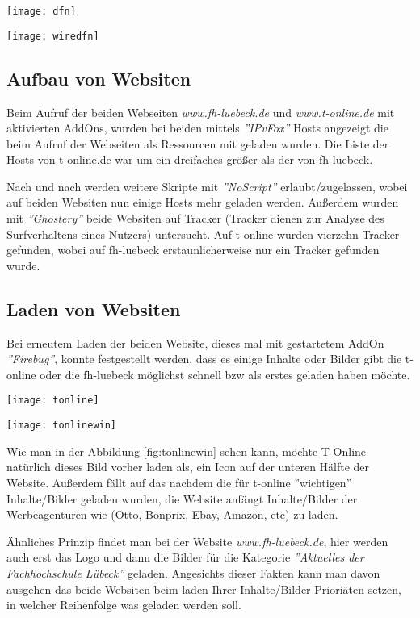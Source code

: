 \documentclass{scrartcl}
\begin{document}
    \texttt{[image: dfn]}
    \label{fig:dfn}
  
    \texttt{[image: wiredfn]}
    \label{fig:wiredfn}
  
  \subsection[Aufgabe 6 Aufbau von Websiten]{Aufbau von Websiten}
  
  Beim Aufruf der beiden Webseiten \emph{\textit{www.fh-luebeck.de}} und \emph{\textit{www.t-online.de}} mit aktivierten AddOns, wurden bei beiden mittels \textit{''IPvFox''} Hosts angezeigt die beim Aufruf der Webseiten als Ressourcen mit geladen wurden. Die Liste der Hosts von t-online.de war um ein dreifaches größer als der von fh-luebeck. 
  
  Nach und nach werden weitere Skripte mit \textit{''NoScript''} erlaubt/zugelassen, wobei auf beiden Websiten nun einige Hosts mehr geladen werden. Außerdem wurden mit \textit{''Ghostery''} beide Websiten auf Tracker (Tracker dienen zur Analyse des Surfverhaltens eines Nutzers) untersucht. Auf t-online wurden vierzehn Tracker gefunden, wobei auf fh-luebeck erstaunlicherweise nur ein Tracker gefunden wurde.
  
  \subsection[Aufgabe 7 Laden von Websiten]{Laden von Websiten}
  
  Bei erneutem Laden der beiden Website, dieses mal mit gestartetem AddOn \textit{''Firebug''}, konnte festgestellt werden, dass es einige Inhalte oder Bilder gibt die t-online oder die fh-luebeck möglichst schnell bzw als erstes geladen haben möchte. 
  
    \texttt{[image: tonline]}
    \label{fig:tonline}
  
    \texttt{[image: tonlinewin]}
    \label{fig:tonlinewin}
  
  Wie man in der Abbildung \ref{fig:tonlinewin} sehen kann, möchte T-Online natürlich dieses Bild vorher laden als, ein Icon auf der unteren Hälfte der Website.
  Außerdem fällt auf das nachdem die für t-online ''wichtigen'' Inhalte/Bilder geladen wurden, die Website anfängt Inhalte/Bilder der Werbeagenturen wie (Otto, Bonprix, Ebay, Amazon, etc) zu laden. 
  
  Ähnliches Prinzip findet man bei der Website \emph{\textit{www.fh-luebeck.de}}, hier werden auch erst das Logo und dann die Bilder für die Kategorie \textit{''Aktuelles der Fachhochschule Lübeck''} geladen. Angesichts dieser Fakten kann man davon ausgehen das beide Websiten beim laden Ihrer Inhalte/Bilder Prioriäten setzen, in welcher Reihenfolge was geladen werden soll.
  
\end{document}
